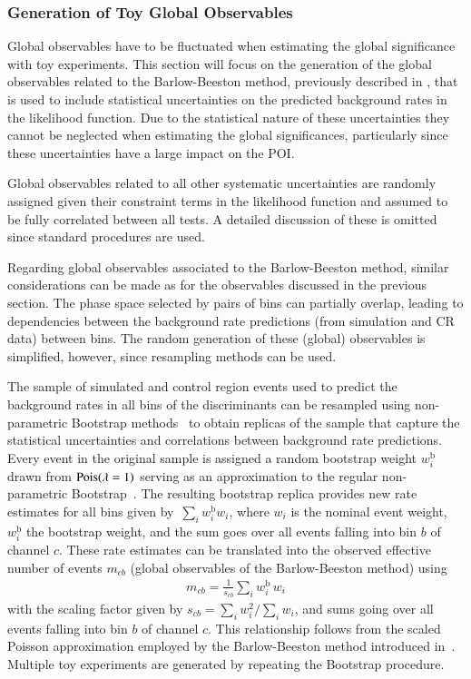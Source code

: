 \subsubsection{Generation of Toy Global Observables}%
\label{sec:toys_global_observables}

Global observables have to be fluctuated when estimating the global
significance with toy experiments. This section will focus on the
generation of the global observables related to the Barlow-Beeston
method, previously described in , that is
used to include statistical uncertainties on the predicted background
rates in the likelihood function. Due to the statistical nature of
these uncertainties they cannot be neglected when estimating the
global significances, particularly since these uncertainties have a
large impact on the POI.

Global observables related to all other systematic uncertainties are
randomly assigned given their constraint terms in the likelihood
function and assumed to be fully correlated between all tests. A
detailed discussion of these is omitted since standard procedures are
used.

Regarding global observables associated to the Barlow-Beeston method,
similar considerations can be made as for the observables discussed in
the previous section. The phase space selected by pairs of bins can
partially overlap, leading to dependencies between the background rate
predictions (from simulation and CR data) between bins. The random
generation of these (global) observables is simplified, however, since
resampling methods can be used.

The sample of simulated and control region events used to predict the
background rates in all bins of the discriminants can be resampled
using non-parametric Bootstrap
methods~\cite{10.1214/aos/1176344552,efron1994introduction} to obtain
replicas of the sample that capture the statistical uncertainties and
correlations between background rate predictions. Every event in the
original sample is assigned a random bootstrap weight $w_i^{\text{b}}$
drawn from $\operatorname{Pois}(\lambda = 1)$ serving as an approximation to the
regular non-parametric
Bootstrap~\cite{google:poisson,ATL-PHYS-PUB-2021-011}. The resulting
bootstrap replica provides new rate estimates for all bins given
by~$\sum_{i} w_{i}^{\text{b}} w_i$, where $w_i$ is the nominal event
weight, $w_i^{\text{b}}$ the bootstrap weight, and the sum goes over
all events falling into bin $b$ of channel $c$. These rate estimates
can be translated into the observed effective number of events
$m_{cb}$ (global observables of the Barlow-Beeston method) using
\begin{align*}
  m_{cb} = \frac{1}{s_{cb}} \sum_{i} w_{i}^{\text{b}} \, w_i
\end{align*}
with the scaling factor given by $s_{cb} = \sum_i w_i^2 / \sum_i w_i$,
and sums going over all events falling into bin $b$ of channel
$c$. This relationship follows from the scaled Poisson approximation
employed by the Barlow-Beeston method introduced
in~. Multiple toy experiments are generated
by repeating the Bootstrap procedure.

